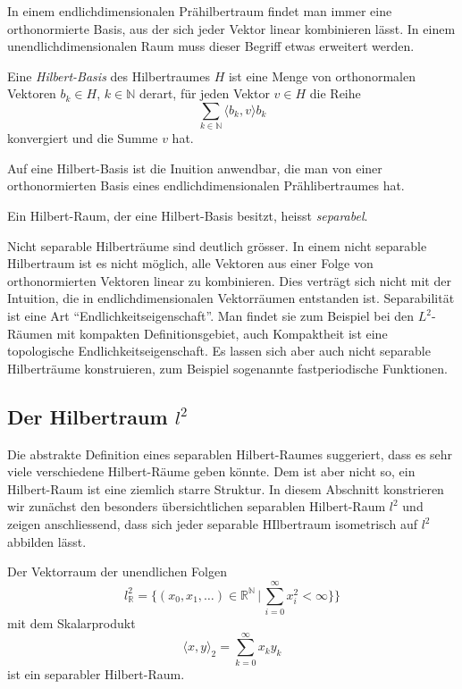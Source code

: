 In einem endlichdimensionalen Prähilbertraum findet man immer eine
orthonormierte Basis, aus der sich jeder Vektor linear kombinieren
lässt.
In einem unendlichdimensionalen Raum muss dieser Begriff etwas 
erweitert werden.

\begin{definition}
Eine {\em Hilbert-Basis} des Hilbertraumes $H$ ist eine Menge von orthonormalen
%
Vektoren $b_k\in H$, $k\in \mathbb{N}$ derart, für jeden Vektor $v\in H$
die Reihe 
\[
\sum_{k\in\mathbb{N}} \langle b_k,v\rangle b_k
\]
konvergiert und die Summe $v$ hat.
\end{definition}

Auf eine Hilbert-Basis ist die Inuition anwendbar, die man von 
einer orthonormierten Basis eines endlichdimensionalen Prählibertraumes
hat.

\begin{definition}
%
Ein Hilbert-Raum, der eine Hilbert-Basis besitzt, heisst {\em separabel}.
\end{definition}

Nicht separable Hilberträume sind deutlich grösser.
In einem nicht separable Hilbertraum ist es nicht möglich, alle Vektoren
aus einer Folge von orthonormierten Vektoren linear zu kombinieren.
Dies verträgt sich nicht mit der Intuition, die in endlichdimensionalen
Vektorräumen entstanden ist.
Separabilität ist eine Art ``Endlichkeitseigenschaft''.
Man findet sie zum Beispiel bei den $L^2$-Räumen mit kompakten
Definitionsgebiet, auch Kompaktheit ist eine topologische
Endlichkeitseigenschaft.
Es lassen sich aber auch nicht separable Hilberträume konstruieren,
zum Beispiel sogenannte fastperiodische Funktionen.
%

%
%
\subsection{Der Hilbertraum $l^2$}
Die abstrakte Definition eines separablen Hilbert-Raumes suggeriert,
dass es sehr viele verschiedene Hilbert-Räume geben könnte.
Dem ist aber nicht so, ein Hilbert-Raum ist eine ziemlich starre Struktur.
In diesem Abschnitt konstrieren wir zunächst den besonders übersichtlichen
separablen Hilbert-Raum $l^2$ und zeigen anschliessend, dass sich jeder
separable HIlbertraum isometrisch auf $l^2$ abbilden lässt.

\begin{satz}
Der Vektorraum der unendlichen Folgen
\[
l^2_{\mathbb{R}}
=
\biggl\{
(x_0,x_1,\dots)
\in
\mathbb{R}^{\mathbb{N}}
\,\bigg|\,
\sum_{i=0}^\infty x_i^2<\infty\biggr\}
\}
\]
mit dem Skalarprodukt
\[
\langle x,y\rangle_2
=
\sum_{k=0}^\infty x_ky_k
\]
ist ein separabler Hilbert-Raum.
\end{satz}

